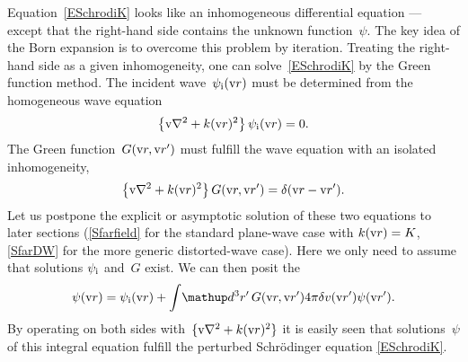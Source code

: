 Equation~\cref{ESchrodiK} looks
like an inhomogeneous differential equation ---
except that the right-hand side contains the unknown function~$\psi$.
The key idea of the Born expansion is to overcome this problem by iteration.
Treating the right-hand side as a given inhomogeneity,
one can solve~\cref{ESchrodiK} by the Green function method.
The incident wave~$\psi_{\text{i}}(\text{v}{r})$ must be determined from the homogeneous wave equation
\begin{equation}\label{EHomoK}
  \left\{\text{v}{\nabla}^2+k(\text{v}{r})^2\right\}\psi_{\text{i}}(\text{v}{r}) = 0.
\end{equation}
The Green function~$G(\text{v}{r},\text{v}{r}')$ must fulfill the wave equation with an isolated inhomogeneity,
%
\begin{equation}\label{EGreenK}
  \left\{\text{v}{\nabla}^2+k(\text{v}{r})^2\right\}G(\text{v}{r},\text{v}{r}') = \delta(\text{v}{r}-\text{v}{r}').
\end{equation}
Let us postpone the explicit or asymptotic solution of these two equations
to later sections (\cref{Sfarfield} for the standard plane-wave case with $k(\text{v}{r})=K$,
\cref{SfarDW} for the more generic distorted-wave case).
Here we only need to assume that solutions $\psi_{\text{i}}$ and~$G$ exist.
We can then posit the 
%
\begin{equation}\label{EPsiFormal}
  \psi(\r)
  = \psi_\si(\r)
  + \int\!\d^3r'\, G(\r,\r') 4\pi\delta v(\r')\psi(\r').
\end{equation}
By operating on both sides with~$\{\text{v}{\nabla}^2+k(\text{v}{r})^2\}$
it is easily seen that solutions~$\psi$ of this integral equation
fulfill the perturbed Schrödinger equation \cref{ESchrodiK}.

